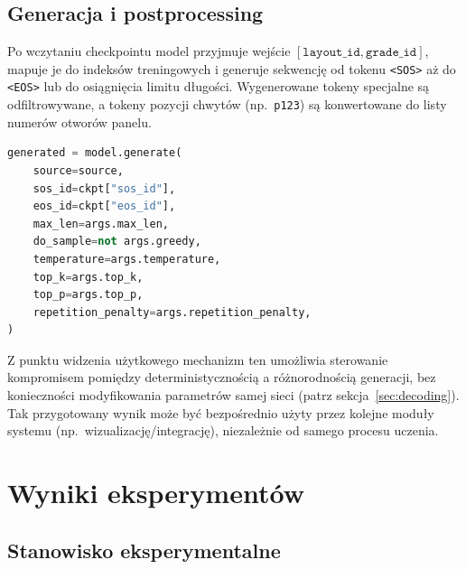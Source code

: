 \documentclass[12pt,a4paper]{article}
\begin{document}
\subsection{Generacja i postprocessing}

Po wczytaniu checkpointu model przyjmuje wejście $[\texttt{layout\_id}, \texttt{grade\_id}]$, mapuje je do indeksów treningowych i generuje sekwencję od tokenu \texttt{<SOS>} aż do \texttt{<EOS>} lub do osiągnięcia limitu długości. Wygenerowane tokeny specjalne są odfiltrowywane, a tokeny pozycji chwytów (np.\ \texttt{p123}) są konwertowane do listy numerów otworów panelu.

\begin{lstlisting}[language=Python,caption={Konfiguracja dekodowania --- moduł inferencji.}]
generated = model.generate(
    source=source,
    sos_id=ckpt["sos_id"],
    eos_id=ckpt["eos_id"],
    max_len=args.max_len,
    do_sample=not args.greedy,
    temperature=args.temperature,
    top_k=args.top_k,
    top_p=args.top_p,
    repetition_penalty=args.repetition_penalty,
)
\end{lstlisting}

Z punktu widzenia użytkowego mechanizm ten umożliwia sterowanie kompromisem pomiędzy deterministycznością a różnorodnością generacji, bez konieczności modyfikowania parametrów samej sieci (patrz sekcja~\ref{sec:decoding}). Tak przygotowany wynik może być bezpośrednio użyty przez kolejne moduły systemu (np.\ wizualizację/integrację), niezależnie od samego procesu uczenia.

\section{Wyniki eksperymentów}
\label{sec:experiments}

\subsection{Stanowisko eksperymentalne}
\label{sec:exp-setup}
\end{document}
